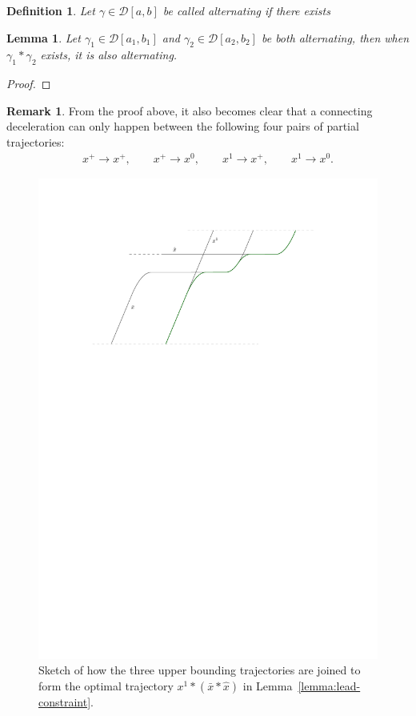 \documentclass[a4paper]{article}
\theoremstyle{definition}
\newtheorem{remark}{Remark}
\theoremstyle{plain}
\newtheorem{define}{Definition\hspace{0.25em}\ignorespaces}
\newtheorem{lemma}{Lemma\hspace{0.25em}\ignorespaces}
\begin{document}
\begin{define}
  Let $\gamma \in \mathcal{D}[a, b]$ be called \emph{alternating} if there exists
\end{define}

\begin{lemma}
  Let $\gamma_{1} \in \mathcal{D}[a_{1}, b_{1}]$ and $\gamma_{2} \in \mathcal{D}[a_{2}, b_{2}]$ be both alternating, then when $\gamma_{1} * \gamma_{2}$ exists, it is also alternating.
\end{lemma}
\begin{proof}

\end{proof}

\begin{remark}
  From the proof above, it also becomes clear that a connecting deceleration can only happen between the following four pairs of partial trajectories:
  \begin{align*}
     x^{+} \rightarrow x^{+} , \quad \quad
     x^{+} \rightarrow x^{0} , \quad \quad
     x^{1} \rightarrow x^{+} , \quad \quad
     x^{1} \rightarrow x^{0} .
  \end{align*}
\end{remark}


\begin{figure}
  \centering
  \includegraphics[scale=1]{figures/motion/rough/proof}
  \caption{Sketch of how the three upper bounding trajectories are joined to
    form the optimal trajectory $x^{1} * (\bar{x} * \hat{x})$ in
    Lemma~\ref{lemma:lead-constraint}.}%
  \label{fig:theorem-proof}
\end{figure}
\end{document}
